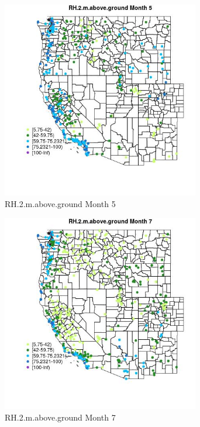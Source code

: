 \begin{figure} 
\centering  
\includegraphics[width=0.77\textwidth]{Code_Outputs/Report_ML_input_PM25_Step4_part_e_de_duplicated_aves_compiled_2019-05-18wNAs_MapObsMo5RH2maboveground.jpg} 
\caption{\label{fig:Report_ML_input_PM25_Step4_part_e_de_duplicated_aves_compiled_2019-05-18wNAsMapObsMo5RH2maboveground}RH.2.m.above.ground Month 5} 
\end{figure} 
 

\begin{figure} 
\centering  
\includegraphics[width=0.77\textwidth]{Code_Outputs/Report_ML_input_PM25_Step4_part_e_de_duplicated_aves_compiled_2019-05-18wNAs_MapObsMo7RH2maboveground.jpg} 
\caption{\label{fig:Report_ML_input_PM25_Step4_part_e_de_duplicated_aves_compiled_2019-05-18wNAsMapObsMo7RH2maboveground}RH.2.m.above.ground Month 7} 
\end{figure} 
 

